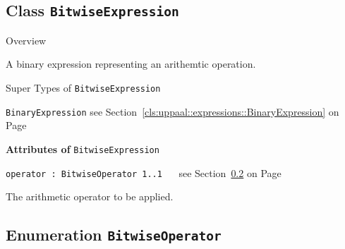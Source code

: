 	

\subsection{Class \bfseries \texttt{BitwiseExpression}\normalfont}
\label{cls:uppaal::expressions::BitwiseExpression} 
	
	\begin{longdescription}
		\item[Overview] 		
				

	

		A binary expression representing an arithemtic operation.		
		\item[Super Types of \texttt{BitwiseExpression}] ~
			\begin{longdescription}
				\item[\texttt{BinaryExpression}] see Section~\ref{cls:uppaal::expressions::BinaryExpression} on Page~\pageref{cls:uppaal::expressions::BinaryExpression}						\end{longdescription}
		
	
			\item[\textbf{Attributes of} \texttt{BitwiseExpression}] ~
			\begin{longdescription}
	\item[\texttt{operator : BitwiseOperator 	\symbol{"5B}1..1\symbol{"5D}
}] ~
	see Section~\ref{cls:uppaal::expressions::BitwiseOperator} on Page~\pageref{cls:uppaal::expressions::BitwiseOperator}
	
	\nopagebreak
		
				

	

		The arithmetic operator to be applied.		
			\end{longdescription}
	
	\end{longdescription}
	

\subsection{Enumeration \bfseries \texttt{BitwiseOperator}\normalfont}
\label{cls:uppaal::expressions::BitwiseOperator} 

